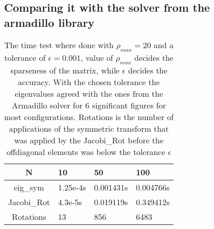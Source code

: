 \documentclass[11pt,a4wide]{article}
\begin{document}
	\subsection{Comparing it with the solver from the armadillo library}
	\begin{table}
		\begin{tabular}{|c|l|l|l|}
		\hline
		N			& 	10			&	50			&	100			&	
		\\ \hline
		eig\_sym	&	1.25e-4s	&	0.001431s	&	0.004766s	&
		\\	\hline		
		Jacobi\_Rot	&	4.3e-5s		&	0.019119s	&	0.349412s	&
		\\ \hline
		Rotations	& 13			&	856			& 	6483		&
		\\ \hline
		\end{tabular}
	\caption{The time test where done with \(\rho_{max}= 20\) and a tolerance of \( \epsilon = 0.001\), value of \(\rho_{max}\) 
			decides the sparseness of the matrix, while \(\epsilon\) decides the accuracy. With the chosen tolerance the eigenvalues 
			agreed with the ones from the Armadillo solver for \(6\) significant figures for most configurations.
			Rotations is the number of applications of the symmetric transform that was applied by the Jacobi\_Rot before the offdiagonal elements was below 
			the tolerance \(\epsilon\)}
	\end{table}
		
		
\end{document}
